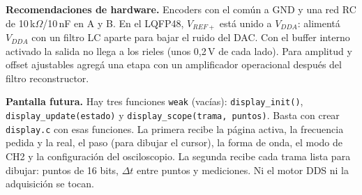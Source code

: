 \documentclass[11pt,a4paper]{article}
\begin{document}
\noindent\textbf{Recomendaciones de hardware.} Encoders con el común a GND y una
red RC de 10\,k$\Omega$/10\,nF en A y B. En el LQFP48, $V_{REF+}$ está unido a
$V_{DDA}$: alimentá $V_{DDA}$ con un filtro LC aparte para bajar el ruido del DAC.
Con el buffer interno activado la salida no llega a los rieles (unos 0,2\,V de
cada lado). Para amplitud y offset ajustables agregá una etapa con un
amplificador operacional después del filtro reconstructor.

\noindent\textbf{Pantalla futura.} Hay tres funciones \texttt{weak} (vacías):
\texttt{display\_init()}, \texttt{display\_update(estado)} y
\texttt{display\_scope(trama, puntos)}. Basta con
crear \texttt{display.c} con esas funciones. La primera recibe la página activa,
la frecuencia pedida y la real, el paso (para dibujar el cursor), la forma de
onda, el modo de CH2 y la configuración del osciloscopio. La segunda recibe
cada trama lista para dibujar: puntos de 16 bits, $\Delta t$ entre puntos y
mediciones. Ni el motor DDS ni la adquisición se tocan.
\end{document}
